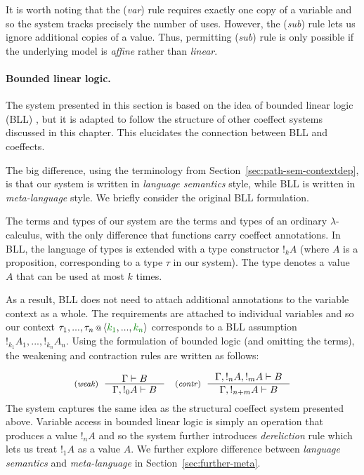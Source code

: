 It is worth noting that the (\emph{var}) rule requires exactly one copy of a variable and so
the system tracks precisely the number of uses. However, the (\emph{sub}) rule lets us
ignore additional copies of a value. Thus, permitting (\emph{sub}) rule is only possible if the
underlying model is \emph{affine} rather than \emph{linear}.

\paragraph{Bounded linear logic.}
The system presented in this section is based on the idea of bounded linear logic (BLL)
\cite{logic-bounded}, but it is adapted to follow the structure of other coeffect systems
discussed in this chapter. This elucidates the connection between BLL and coeffects.

The big difference, using the terminology from Section~\ref{sec:path-sem-contextdep}, is
that our system is written in \emph{language semantics} style, while BLL is written
in \emph{meta-language} style. We briefly consider the original BLL formulation.

The terms and types of our system are the terms and types of an ordinary $\lambda$-calculus,
with the only difference that functions carry coeffect annotations. In BLL, the language of
types is extended with a type constructor $!_k A$ (where $A$ is a proposition, corresponding
to a type $\tau$ in our system). The type denotes a value $A$ that can be used at most $k$ times.

As a result, BLL does not need to attach additional annotations to the variable context
as a whole. The requirements are attached to individual variables and so our context
$\coctx{\tau_1, ..., \tau_n}{\langle \cclrd{k_1}, ..., \cclrd{k_n}\rangle}$ corresponds
to a BLL assumption $!_{k_1} A_1, ..., !_{k_n} A_n$. Using the formulation of bounded logic
(and omitting the terms), the weakening and contraction rules are written as follows:

\[
\tyrule{weak}
  {\Gamma \vdash B}
  {\Gamma, !_0 A \vdash B}
\quad
\tyrule{contr}
  {\Gamma, !_n A, !_m A \vdash B}
  {\Gamma, !_{n+m} A \vdash B}
\]
%
The system captures the same idea as the structural coeffect system presented above.
Variable access in bounded linear logic is simply an operation that produces a value
$!_n A$ and so the system further introduces \emph{dereliction} rule which lets us
treat $!_1 A$ as a value $A$. We further explore difference between \emph{language
semantics} and \emph{meta-language} in Section~\ref{sec:further-meta}.

